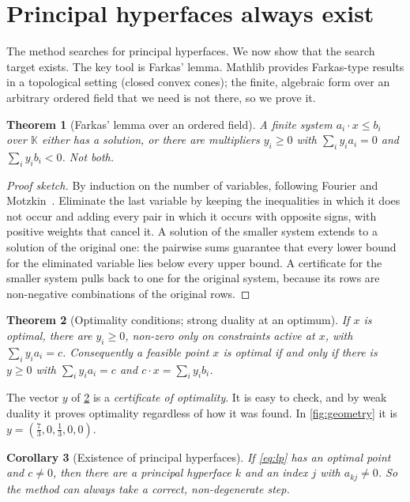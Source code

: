 \documentclass[11pt,a4paper]{article}
\theoremstyle{plain}
\newtheorem{theorem}{Theorem}
\newtheorem{corollary}[theorem]{Corollary}
\theoremstyle{definition}
\theoremstyle{remark}
\newcommand{\K}{\mathbb{K}}
\begin{document}
\section{Principal hyperfaces always exist}\label{sec:existence}

The method searches for principal hyperfaces. We now show that the search target exists. The
key tool is Farkas' lemma. Mathlib provides Farkas-type results in a topological setting (closed
convex cones); the finite, algebraic form over an arbitrary ordered field that we need is not
there, so we prove it.

\begin{theorem}[Farkas' lemma over an ordered field]\label{thm:farkas}
A finite system $a_i\cdot x\le b_i$ over $\K$ either has a solution, or there are multipliers
$y_i\ge0$ with $\sum_i y_i a_i=0$ and $\sum_i y_i b_i<0$. Not both.
\end{theorem}

\begin{proof}[Proof sketch]
By induction on the number of variables, following Fourier and
Motzkin~\cite{motzkin1936,schrijver1986}. Eliminate the last variable by keeping the
inequalities in which it does not occur and adding every pair in which it occurs with opposite
signs, with positive weights that cancel it. A solution of the smaller system extends to a
solution of the original one: the pairwise sums guarantee that every lower bound for the
eliminated variable lies below every upper bound. A certificate for the smaller system pulls
back to one for the original system, because its rows are non-negative combinations of the
original rows.
\end{proof}

\begin{theorem}[Optimality conditions; strong duality at an optimum]\label{thm:kkt}
If $x$ is optimal, there are $y_i\ge0$, non-zero only on constraints active at $x$, with
$\sum_i y_i a_i=c$. Consequently a feasible point $x$ is optimal if and only if there is
$y\ge0$ with $\sum_i y_ia_i=c$ and $c\cdot x=\sum_i y_ib_i$.
\end{theorem}

The vector $y$ of \cref{thm:kkt} is a \emph{certificate of optimality}. It is easy to check, and
by weak duality it proves optimality regardless of how it was found. In \cref{fig:geometry} it
is $y=(\tfrac73,0,\tfrac13,0,0)$.

\begin{corollary}[Existence of principal hyperfaces]\label{cor:exists}
If \eqref{eq:lp} has an optimal point and $c\ne0$, then there are a principal hyperface $k$ and
an index $j$ with $a_{kj}\ne0$. So the method can always take a correct, non-degenerate step.
\end{corollary}
\end{document}
